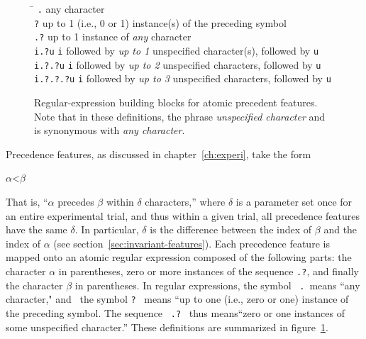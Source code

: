 {\begin{figure}[t]
\begin{mdframed}
\begin{tabbing}
 \hspace{1in}  \=  \hspace{5.5in} \kill
\texttt{.} \> any character\\
\texttt{?} \> up to 1 (i.e., 0 or 1) instance(s) of the preceding symbol \\
\texttt{.?} \> up to 1 instance of \emph{any} character\\
\texttt{i.?u}  \>\texttt{i} followed by \emph{up to 1} unspecified character(s), followed by \texttt{u}\\
\texttt{i.?.?u}  \>\texttt{i} followed by \emph{up to 2} unspecified characters, followed by \texttt{u}\\
\texttt{i.?.?.?u}  \>\texttt{i} followed by \emph{up to 3} unspecified characters, followed by \texttt{u}\\
\end{tabbing}
\caption{Regular-expression building blocks for atomic precedent features. Note that in these definitions, the phrase \emph{unspecified character} %
and is synonymous with \emph{any character}. }
\label{fig:regex-defs}
\end{mdframed}
\end{figure}

Precedence features, as discussed in chapter~\ref{ch:experi}, take the form
\begin{center}
$\alpha\text{<}\beta$
\end{center}
That is, ``$\alpha$ precedes $\beta$ within $\delta$ characters,'' where $\delta$ is 
a parameter set once for an entire experimental trial, and thus within a given trial, all precedence features
have the same $\delta$.  In particular, $\delta$ is the difference between the 
index of $\beta$ and the index of $\alpha$ (see section~\ref{sec:invariant-features}).
Each precedence feature is mapped onto an atomic regular expression composed of the following parts:
the character $\alpha$ in parentheses, zero or more instances of the sequence \texttt{.?},  and finally
the character $\beta$ in parentheses. In regular expressions, the symbol \, \texttt{.} \,means ``any character," and 
\, the symbol \texttt{?} \, means ``up to one (i.e., zero or one) instance of the preceding symbol. The sequence \, \texttt{.?} \, 
thus means``zero or one instances of some unspecified character.'' These definitions are summarized in figure~\ref{fig:regex-defs}.

}
